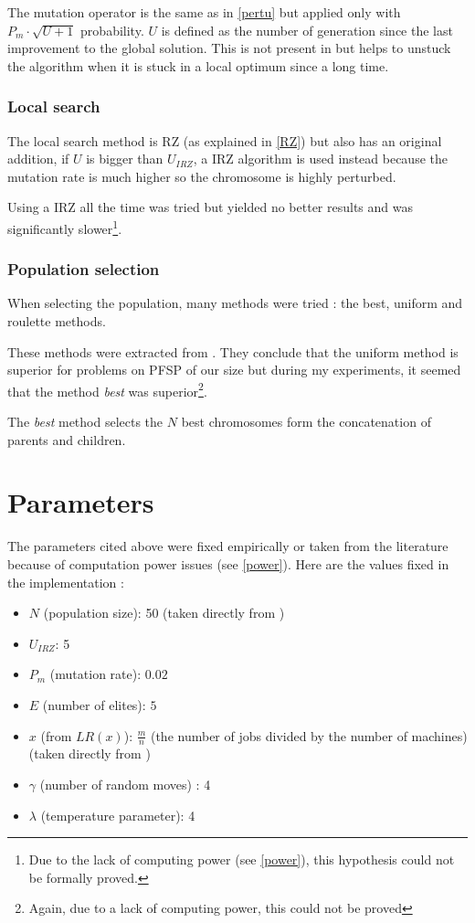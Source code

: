 \documentclass[a4paper]{article}
\begin{document}
The mutation operator is the same as in \ref{pertu} but applied only with $P_m \cdot \sqrt{U + 1}$ probability.
$U$ is defined as the number of generation since the last improvement to the global solution. This is not present in \cite{zhang2009} but helps to unstuck the algorithm when it is stuck in a local optimum since a long time.


\subsubsection{Local search}

The local search method is RZ (as explained in \ref{RZ}) but also has an original addition, if $U$ is bigger than $U_{IRZ}$, a IRZ algorithm is used instead because the mutation rate is much higher so the chromosome is highly perturbed.

Using a IRZ all the time was tried but yielded no better results and was significantly slower\footnote{Due to the lack of computing power (see \ref{power}), this hypothesis could not be formally proved.}.

\subsubsection{Population selection}

When selecting the population, many methods were tried : the best, uniform and roulette methods.

These methods were extracted from \cite{Kouki}. They conclude that the uniform method is superior for problems on PFSP of our size but during my experiments, it seemed that the method \textit{best} was superior\footnote{Again, due to a lack of computing power, this could not be proved}.

The \textit{best} method selects the $N$ best chromosomes form the concatenation of parents and children.


\section{Parameters}

The parameters cited above were fixed empirically or taken from the literature because of computation power issues (see \ref{power}). Here are the values fixed in the implementation :

\begin{itemize}
    \item $N$ (population size): 50 (taken directly from \cite{zhang2009})
    \item $U_{IRZ}$: 5
    \item $P_m$ (mutation rate): $0.02$
    \item $E$ (number of elites): $5$
    \item $x$ (from $LR(x)$): $\frac{m}{n}$ (the number of jobs divided by the number of machines) (taken directly from \cite{panruiz2012})
    \item $\gamma$ (number of random moves) : 4
    \item $\lambda$ (temperature parameter): 4
\end{itemize}
\end{document}
